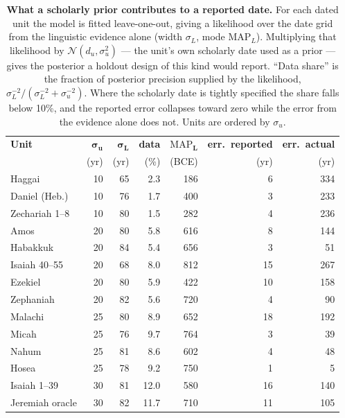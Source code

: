 \begin{table}[!ht]
\centering
\caption{\textbf{What a scholarly prior contributes to a reported date.}
For each dated unit the model is fitted leave-one-out, giving a likelihood
over the date grid from the linguistic evidence alone (width
$\sigma_L$, mode $\mathrm{MAP}_L$).  Multiplying that likelihood by
$\mathcal{N}(d_u, \sigma_u^2)$ --- the unit's own scholarly date used as a
prior --- gives the posterior a holdout design of this kind would report.
``Data share'' is the fraction of posterior precision supplied by the
likelihood, $\sigma_L^{-2}/(\sigma_L^{-2}+\sigma_u^{-2})$.  Where the
scholarly date is tightly specified the share falls below 10\%, and the
reported error collapses toward zero while the error from the evidence
alone does not.  Units are ordered by $\sigma_u$.}
\begin{tabular}{lrrrrrr}
\hline
\textbf{Unit} & $\mathbf{\sigma_u}$ & $\mathbf{\sigma_L}$ & \textbf{data} & $\mathbf{\mathrm{MAP}_L}$ & \textbf{err.\ reported} & \textbf{err.\ actual} \\
 & (yr) & (yr) & (\%) & (BCE) & (yr) & (yr) \\
\hline
Haggai            & 10 & 65 & 2.3 & 186 & 6 & 334 \\
Daniel (Heb.)     & 10 & 76 & 1.7 & 400 & 3 & 233 \\
Zechariah 1--8    & 10 & 80 & 1.5 & 282 & 4 & 236 \\
Amos              & 20 & 80 & 5.8 & 616 & 8 & 144 \\
Habakkuk          & 20 & 84 & 5.4 & 656 & 3 & 51 \\
Isaiah 40--55     & 20 & 68 & 8.0 & 812 & 15 & 267 \\
Ezekiel           & 20 & 80 & 5.9 & 422 & 10 & 158 \\
Zephaniah         & 20 & 82 & 5.6 & 720 & 4 & 90 \\
Malachi           & 25 & 80 & 8.9 & 652 & 18 & 192 \\
Micah             & 25 & 76 & 9.7 & 764 & 3 & 39 \\
Nahum             & 25 & 81 & 8.6 & 602 & 4 & 48 \\
Hosea             & 25 & 78 & 9.2 & 750 & 1 & 5 \\
Isaiah 1--39      & 30 & 81 & 12.0 & 580 & 16 & 140 \\
Jeremiah oracle   & 30 & 82 & 11.7 & 710 & 11 & 105 \\
\hline
\end{tabular}
\label{tab:leakage}
\end{table}
